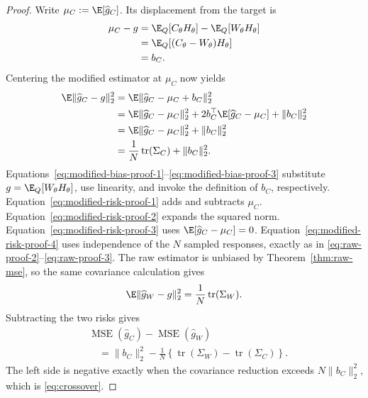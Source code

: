 \begin{proof}
Write $\mu_C:=\E[\widehat g_C]$.  Its displacement from the target is
\begin{align}
  \mu_C-g
  &=\E_Q[C_\theta H_\theta]-\E_Q[W_\theta H_\theta]
    \label{eq:modified-bias-proof-1}\\
  &=\E_Q[(C_\theta-W_\theta)H_\theta]
    \label{eq:modified-bias-proof-2}\\
  &=b_C.
    \label{eq:modified-bias-proof-3}
\end{align}
Centering the modified estimator at $\mu_C$ now yields
\begin{align}
  \E\|\widehat g_C-g\|_2^2
  &=\E\|\widehat g_C-\mu_C+b_C\|_2^2
    \label{eq:modified-risk-proof-1}\\
  &=\E\|\widehat g_C-\mu_C\|_2^2
    +2b_C^\top\E[\widehat g_C-\mu_C]
    +\|b_C\|_2^2
    \label{eq:modified-risk-proof-2}\\
  &=\E\|\widehat g_C-\mu_C\|_2^2+\|b_C\|_2^2
    \label{eq:modified-risk-proof-3}\\
  &=\frac1N\operatorname{tr}(\Sigma_C)+\|b_C\|_2^2.
    \label{eq:modified-risk-proof-4}
\end{align}
Equations~\eqref{eq:modified-bias-proof-1}--\eqref{eq:modified-bias-proof-3}
substitute $g=\E_Q[W_\theta H_\theta]$, use linearity, and invoke the definition
of $b_C$, respectively.  Equation~\eqref{eq:modified-risk-proof-1} adds and
subtracts $\mu_C$.  Equation~\eqref{eq:modified-risk-proof-2} expands the
squared norm.  Equation~\eqref{eq:modified-risk-proof-3} uses
$\E[\widehat g_C-\mu_C]=0$.  Equation~\eqref{eq:modified-risk-proof-4} uses
independence of the $N$ sampled responses, exactly as in
\eqref{eq:raw-proof-2}--\eqref{eq:raw-proof-3}.  The raw estimator is unbiased by
Theorem~\ref{thm:raw-mse}, so the same covariance calculation gives
\begin{equation}
  \E\|\widehat g_W-g\|_2^2
  =\frac1N\operatorname{tr}(\Sigma_W).
  \label{eq:raw-risk-crossover-proof}
\end{equation}
Subtracting the two risks gives
\begin{align}
  &\operatorname{MSE}(\widehat g_C)
    -\operatorname{MSE}(\widehat g_W)
    \label{eq:crossover-proof-1}\\
  &\quad=\|b_C\|_2^2
    -\frac1N\left\{
      \operatorname{tr}(\Sigma_W)-\operatorname{tr}(\Sigma_C)
    \right\}.
    \label{eq:crossover-proof-2}
\end{align}
The left side is negative exactly when the covariance reduction exceeds
$N\|b_C\|_2^2$, which is \eqref{eq:crossover}.
\end{proof}

